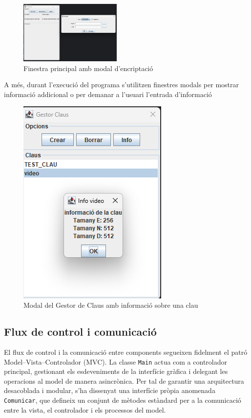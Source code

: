 \documentclass{ieeetj}
\begin{document}
\begin{figure}[H]
    \centering
    \includegraphics[width=0.45\textwidth]{png/finestra.png}
    \caption{Finestra principal amb modal d'encriptació}
    \label{fig:enter-label}
\end{figure}
A més, durant l'execució del programa s'utilitzen finestres modals per mostrar informació addicional o per demanar a l'usuari l'entrada d'informació

\begin{figure}[H]
    \centering
    \includegraphics[width=0.5\linewidth]{png/modal.png}
    \caption{Modal del Gestor de Claus amb informació sobre una clau}
    \label{fig:enter-label}
\end{figure}

\subsection{Flux de control i comunicació}

El flux de control i la comunicació entre components segueixen fidelment el patró Model–Vista–Controlador (MVC). La classe \texttt{Main} actua com a controlador principal, gestionant els esdeveniments de la interfície gràfica i delegant les operacions al model de manera asincrònica. Per tal de garantir una arquitectura desacoblada i modular, s'ha dissenyat una interfície pròpia anomenada \texttt{Comunicar}, que defineix un conjunt de mètodes estàndard per a la comunicació entre la vista, el controlador i els processos del model.
\end{document}
